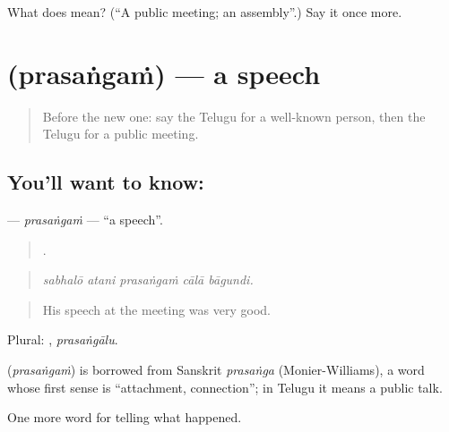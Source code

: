 \begin{tcolorbox}[breakable,colback=teal!4,colframe=teal!35!black,title={Before you move on}]
What does  mean? (\textquotedblleft{}A public meeting; an assembly\textquotedblright{}.) Say it once more.
\end{tcolorbox}
\section[\texorpdfstring{\te{ప్రసంగం} (prasaṅgaṁ)}{ప్రసంగం (prasaṅgaṁ)}]{ (prasaṅgaṁ) — a speech}

\label{lesson:TE-C342-prasangam}



\begin{quote}
Before the new one: say the Telugu for a well-known person, then the Telugu for a public meeting.
\end{quote}

\subsection*{You'll want to know: }
\textbf{} — \emph{prasaṅgaṁ} — \textquotedblleft{}a speech\textquotedblright{}.

\begin{quote}
    .
\end{quote}

\begin{quote}
\emph{sabhalō atani prasaṅgaṁ cālā bāgundi.}
\end{quote}

\begin{quote}
His speech at the meeting was very good.
\end{quote}

Plural: , \emph{prasaṅgālu}.

\begin{cousinweb}
\textbf{} (\emph{prasaṅgaṁ}) is borrowed from Sanskrit \emph{prasaṅga} (Monier-Williams), a word whose first sense is \textquotedblleft{}attachment, connection\textquotedblright{}; in Telugu it means a public talk.
\end{cousinweb}

\begin{grammarlens}[title={What you've built}]
One more word for telling what happened.
\end{grammarlens}

